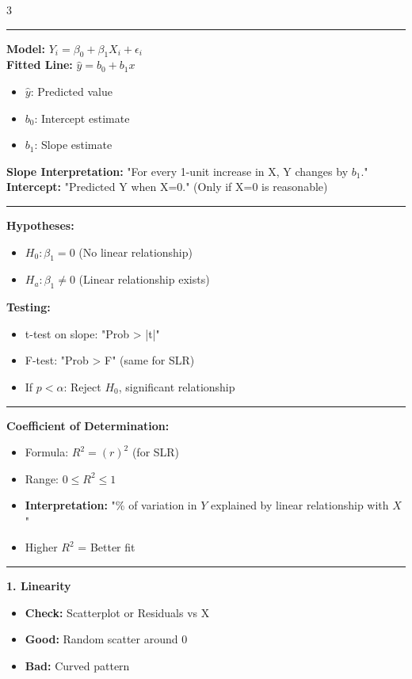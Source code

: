 \documentclass[7pt, letterpaper]{article}
\newcommand{\sectionhead}[1]{%
    \vspace{0.5mm}{\normalsize\bfseries#1}\vspace{0mm}\hrule\vspace{0.5mm}%
}
\begin{document}
\begin{multicols}{3}
\columnbreak

\sectionhead{Simple Linear Regression}
\textbf{Model:} $Y_i = \beta_0 + \beta_1 X_i + \epsilon_i$ \\
\textbf{Fitted Line:} $\hat{y} = b_0 + b_1 x$
\begin{itemize}
    \item $\hat{y}$: Predicted value
    \item $b_0$: Intercept estimate
    \item $b_1$: Slope estimate
\end{itemize}
\textbf{Slope Interpretation:} "For every 1-unit increase in X, Y changes by $b_1$." \\
\textbf{Intercept:} "Predicted Y when X=0." (Only if X=0 is reasonable)

\sectionhead{Inference for Regression}
\textbf{Hypotheses:}
\begin{itemize}
    \item $H_0: \beta_1 = 0$ (No linear relationship)
    \item $H_a: \beta_1 \ne 0$ (Linear relationship exists)
\end{itemize}
\textbf{Testing:}
\begin{itemize}
    \item t-test on slope: "Prob > |t|"
    \item F-test: "Prob > F" (same for SLR)
    \item If $p < \alpha$: Reject $H_0$, significant relationship
\end{itemize}

\sectionhead{Model Fit: $R^2$}
\textbf{Coefficient of Determination:}
\begin{itemize}
    \item Formula: $R^2 = (r)^2$ (for SLR)
    \item Range: $0 \le R^2 \le 1$
    \item \textbf{Interpretation:} "\% of variation in $Y$ explained by linear relationship with $X$"
    \item Higher $R^2$ = Better fit
\end{itemize}

\sectionhead{Assumption Checking}
\textbf{1. Linearity}
\begin{itemize}
    \item \textbf{Check:} Scatterplot or Residuals vs X
    \item \textbf{Good:} Random scatter around 0
    \item \textbf{Bad:} Curved pattern
\end{itemize}


\end{multicols}
\end{document}
